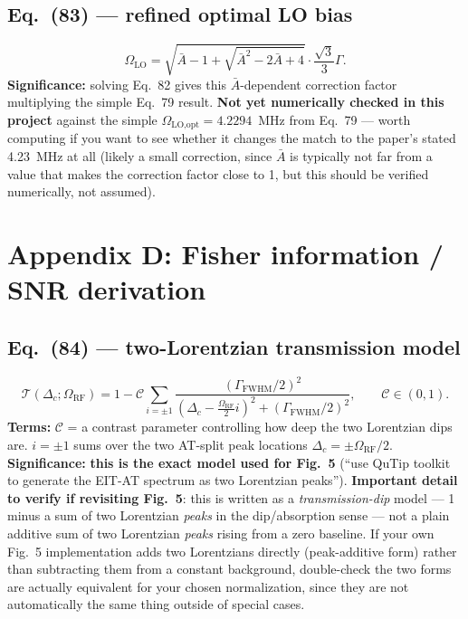 \documentclass[11pt]{article}
\begin{document}
\subsection*{Eq.~(83) --- refined optimal LO bias}
\begin{equation}
\Omega_\text{LO} = \sqrt{\bar A-1+\sqrt{\bar A^2-2\bar A+4}}\cdot\frac{\sqrt3}{3}\Gamma. \tag{83}
\end{equation}
\textbf{Significance:} solving Eq.~82 gives this $\bar A$-dependent
correction factor multiplying the simple Eq.~79 result. \textbf{Not yet
numerically checked in this project} against the simple
$\Omega_\text{LO,opt}=4.2294$~MHz from Eq.~79 --- worth computing if you
want to see whether it changes the match to the paper's stated 4.23~MHz
at all (likely a small correction, since $\bar A$ is typically not far
from a value that makes the correction factor close to 1, but this
should be verified numerically, not assumed).

\section{Appendix D: Fisher information / SNR derivation}

\subsection*{Eq.~(84) --- two-Lorentzian transmission model}
\begin{equation}
\mathcal T(\Delta_c;\Omega_\text{RF}) = 1-\mathcal C\sum_{i=\pm1}\frac{(\Gamma_\text{FWHM}/2)^2}{(\Delta_c-\frac{\Omega_\text{RF}}{2}i)^2+(\Gamma_\text{FWHM}/2)^2}, \qquad \mathcal C\in(0,1). \tag{84}
\end{equation}
\textbf{Terms:} $\mathcal C$ = a contrast parameter controlling how deep
the two Lorentzian dips are. $i=\pm1$ sums over the two AT-split peak
locations $\Delta_c=\pm\Omega_\text{RF}/2$.
\textbf{Significance:} \textbf{this is the exact model used for
Fig.~5} (``use QuTip toolkit to generate the EIT-AT spectrum as two
Lorentzian peaks''). \textbf{Important detail to verify if revisiting
Fig.~5}: this is written as a \emph{transmission-dip} model --- 1 minus
a sum of two Lorentzian \emph{peaks} in the dip/absorption sense --- not
a plain additive sum of two Lorentzian \emph{peaks} rising from a zero
baseline. If your own Fig.~5 implementation adds two Lorentzians
directly (peak-additive form) rather than subtracting them from a
constant background, double-check the two forms are actually
equivalent for your chosen normalization, since they are not
automatically the same thing outside of special cases.
\end{document}
